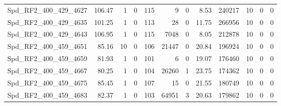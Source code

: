 \begin{longtable}[c]{@{}lrrrrrrrrrrr@{}}
Spd\_RF2\_400\_429\_4627      & 106.47                 & 1                       & 0                       & 115                    & 9                       & 0                       & 8.53                    & 240217                   & 10                       & 0                        & 0                        \\
Spd\_RF2\_400\_429\_4635      & 101.25                 & 1                       & 0                       & 113                    & 28                      & 0                       & 11.75                   & 266956                   & 10                       & 0                        & 0                        \\
Spd\_RF2\_400\_429\_4643      & 106.95                 & 1                       & 0                       & 115                    & 7048                    & 0                       & 8.05                    & 212878                   & 10                       & 0                        & 0                        \\
Spd\_RF2\_400\_459\_4651      & 85.16                  & 10                      & 0                       & 106                    & 21447                   & 0                       & 20.84                   & 196924                   & 10                       & 0                        & 0                        \\
Spd\_RF2\_400\_459\_4659      & 81.93                  & 1                       & 0                       & 101                    & 6                       & 0                       & 19.07                   & 176460                   & 10                       & 0                        & 0                        \\
Spd\_RF2\_400\_459\_4667      & 80.25                  & 1                       & 0                       & 104                    & 26260                   & 1                       & 23.75                   & 174362                   & 10                       & 0                        & 0                        \\
Spd\_RF2\_400\_459\_4675      & 85.45                  & 1                       & 0                       & 107                    & 15                      & 0                       & 21.55                   & 180749                   & 10                       & 0                        & 0                        \\
Spd\_RF2\_400\_459\_4683      & 82.37                  & 1                       & 0                       & 103                    & 64951                   & 3                       & 20.63                   & 179862                   & 10                       & 0                        & 0                        \\

\end{longtable}
